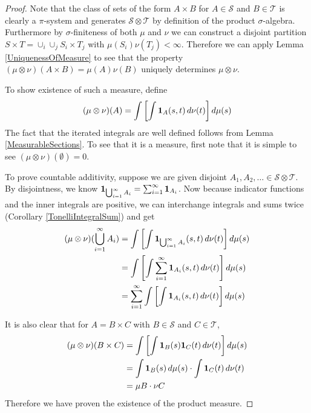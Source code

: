 \documentclass{amsart}
\theoremstyle{remark}
\theoremstyle{definition}
\begin{document}
\begin{proof}Note that the class of sets of the form $A \times B$ for
  $A \in \mathcal{S}$ and $B \in \mathcal{T}$ is clearly a
  $\pi$-system and generates $\mathcal{S} \otimes \mathcal{T}$ by
  definition of the product $\sigma$-algebra.  Furthermore by
  $\sigma$-finiteness of both $\mu$ and $\nu$ we can construct a
  disjoint partition $S \times T = \cup_i \cup_j S_i \times T_j$ with
  $\mu(S_i)\nu(T_j) < \infty$.  Therefore we can apply Lemma
  \ref{UniquenessOfMeasure} to see that the property $(\mu \otimes
  \nu)(A \times B) = \mu(A) \nu(B)$ uniquely determines $\mu \otimes
  \nu$.

To show existence of such a measure, define 
\begin{align*}
(\mu \otimes \nu)(A) = \int \left [\int \textbf{1}_{A}(s,t) \, d
  \nu(t) \right ] d \mu(s)
\end{align*}
The fact that the iterated integrals are well defined follows from
Lemma \ref{MeasurableSections}.  
To see that it is a measure, first
note that it is simple to see $(\mu \otimes \nu)(\emptyset) = 0$.

To prove countable additivity, suppose we are given disjoint $A_1,
A_2, \dots \in \mathcal{S}
\otimes \mathcal{T}$.  By disjointness, we know
$\textbf{1}_{\bigcup_{i=1}^\infty A_i} = \sum_{i=1}^\infty \textbf{1}_{A_i}$.
Now because indicator functions and the inner integrals are positive, we can interchange
integrals and sums twice (Corollary \ref{TonelliIntegralSum}) and get
\begin{align*}
(\mu \otimes \nu)(\bigcup_{i=1}^\infty A_i) &= \int \left [ \int
\textbf{1}_{\bigcup_{i=1}^\infty A_i}(s,t) \, d \nu(t) \right ] d \mu(s)\\
&= \int \left [ \int \sum_{i=1}^\infty \textbf{1}_{A_i}(s,t) \, d
  \nu(t) \right ]  d \mu(s)\\
&= \sum_{i=1}^\infty \int \left [ \int \textbf{1}_{A_i}(s,t) \, d
  \nu(t) \right ] d \mu(s)\\
\end{align*}

It is also clear that for $A = B \times C$ with $B \in \mathcal{S}$
and $C \in \mathcal{T}$, 
\begin{align*}
(\mu \otimes \nu)(B \times C) &= \int \left [ \int \textbf{1}_{B}(s)
\textbf{1}_{C}(t) \, d\nu(t) \right ] d \mu(s)\\
&= \int \textbf{1}_{B}(s) \, d \mu(s) \cdot \int 
\textbf{1}_{C}(t) \, d\nu(t) \\
&= \mu B \cdot \nu C
\end{align*}
Therefore we have proven the existence of the product measure.


\end{proof}
\end{document}
